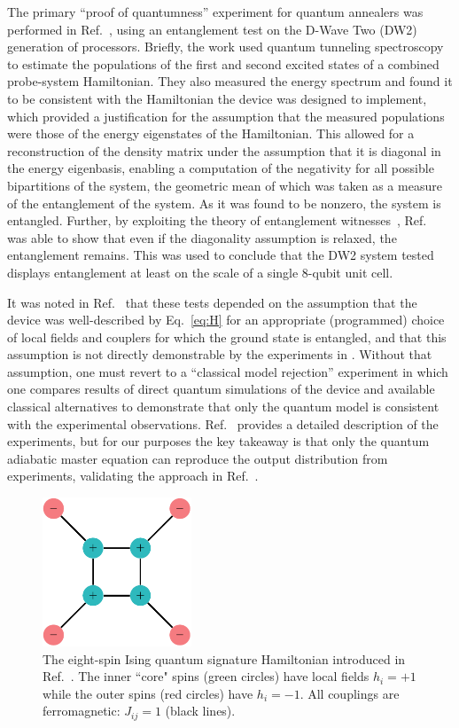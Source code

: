 The primary ``proof of quantumness'' experiment for quantum annealers was performed in Ref.~\cite{DWave-entanglement}, using an entanglement test on the D-Wave Two (DW2) generation of processors. Briefly, the work used quantum tunneling spectroscopy \cite{Berkley:2013bf} to estimate the populations of the first and second excited states of a combined probe-system Hamiltonian. They also measured the energy spectrum and found it to be consistent with the Hamiltonian the device was designed to implement, which provided a justification for the assumption that the measured populations were those of the energy eigenstates of the Hamiltonian.
This allowed for a reconstruction of the density matrix under the assumption that it is diagonal in the energy eigenbasis, enabling a computation of the negativity \cite{Vidal:02a} for all possible bipartitions of the system, the geometric mean of which was taken as a measure of the entanglement of the system. As it was found to be nonzero, the system is entangled. Further, by exploiting the theory of entanglement witnesses~\cite{Spedalieri:2012fk},
Ref.~\cite{DWave-entanglement} was able to show that even if the diagonality assumption is relaxed, the entanglement remains. This was used to conclude that the DW2 system tested displays entanglement at least on the scale of a single $8$-qubit unit cell.

It was noted in Ref.~\cite{Albash:2015pd} that these tests depended on the assumption that the device was well-described by Eq.~\eqref{eq:H} for an appropriate (programmed) choice of local fields and couplers for which the ground state is entangled, and that this assumption is not directly demonstrable by the experiments in \cite{DWave-entanglement}. Without that assumption, one must revert to a ``classical model rejection'' experiment in which one compares results of direct quantum simulations of the device and available classical alternatives to demonstrate that only the quantum model is consistent with the experimental observations. Ref.~\cite{Albash:2015pd} provides a detailed description of the experiments, but for our purposes the key takeaway is that only the quantum adiabatic master equation \cite{aqcME} can reproduce the output distribution from experiments, validating the approach in Ref.~\cite{DWave-entanglement}.

\begin{figure}[t]
\centering
 \includegraphics[height=1.75in]{chapters/Test-driving/signature}
\caption{The eight-spin Ising quantum signature Hamiltonian introduced in Ref.~\cite{q-sig}. The inner ``core" spins (green circles) have local fields $h_i = +1$ while the outer spins (red circles) have $h_i = -1$.  All  couplings are ferromagnetic: $J_{ij} = 1$ (black lines).}
\label{fig:signaturehamiltonian}
\end{figure}

